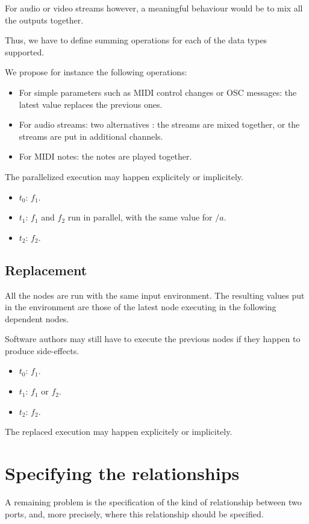 \documentclass{article}
\begin{document}
For audio or video streams however, a meaningful behaviour would be to mix all the outputs together.
    
Thus, we have to define summing operations for each of the data types supported.
    
We propose for instance the following operations: 
\begin{itemize}
  \item For simple parameters such as MIDI control changes or OSC messages: the latest value replaces the previous ones.
  \item For audio streams: two alternatives : the streams are mixed together, or the streams are put in additional channels.
  \item For MIDI notes: the notes are played together.
\end{itemize}

The parallelized execution may happen explicitely or implicitely.

\begin{itemize}
  \item $t_0$: $f_1$.
  \item $t_1$: $f_1$ and $f_2$ run in parallel, with the same value for $/a$.
  \item $t_2$: $f_2$. 
\end{itemize}
     
\subsection{Replacement}
All the nodes are run with the same input environment. 
The resulting values put in the environment are those of the latest node executing in the following dependent nodes.
    
Software authors may still have to execute the previous nodes if they happen to produce side-effects.
    
\begin{itemize}
  \item $t_0$: $f_1$.
  \item $t_1$: $f_1$ or $f_2$.
  \item $t_2$: $f_2$. 
\end{itemize}

The replaced execution may happen explicitely or implicitely.
    
\section{Specifying the relationships}
A remaining problem is the specification of the kind of relationship between two ports, and, more precisely, 
where this relationship should be specified.
    
\end{document}
